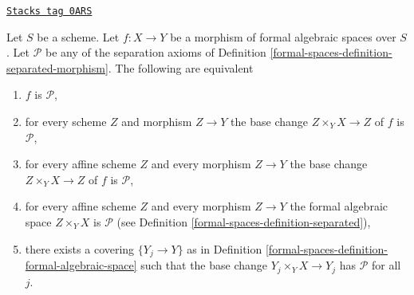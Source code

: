 \begin{lemma}
\label{formal-spaces-lemma-separated-local}
\href{https://stacks.math.columbia.edu/tag/0ARS}{\texttt{Stacks tag 0ARS}}

Let $S$ be a scheme. Let $f : X \to Y$ be a morphism of formal algebraic spaces
over $S$. Let $\mathcal{P}$ be any of the separation axioms of
Definition \ref{formal-spaces-definition-separated-morphism}.
The following are equivalent
\begin{enumerate}
\item $f$ is $\mathcal{P}$,
\item for every scheme $Z$ and morphism $Z \to Y$ the
base change $Z \times_Y X \to Z$ of $f$ is $\mathcal{P}$,
\item for every affine scheme $Z$ and every morphism $Z \to Y$ the
base change $Z \times_Y X \to Z$ of $f$ is $\mathcal{P}$,
\item for every affine scheme $Z$ and every morphism $Z \to Y$ the
formal algebraic space $Z \times_Y X$ is $\mathcal{P}$ (see
Definition \ref{formal-spaces-definition-separated}),
\item there exists a covering $\{Y_j \to Y\}$ as in
Definition \ref{formal-spaces-definition-formal-algebraic-space}
such that the base change $Y_j \times_Y X \to Y_j$ has
$\mathcal{P}$ for all $j$.
\end{enumerate}
\end{lemma}

